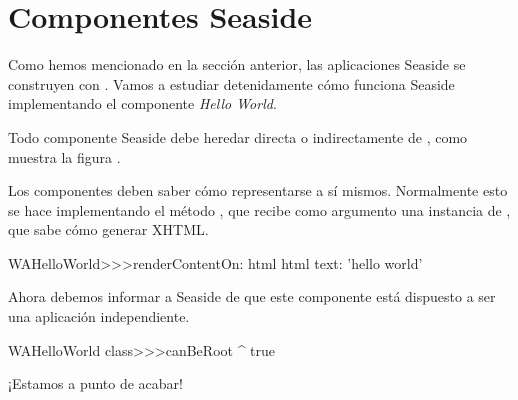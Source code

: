 \documentclass[a4paper,10pt,twoside]{book}
\begin{document}
\section{Componentes Seaside}


Como hemos mencionado en la sección anterior, las aplicaciones Seaside se construyen con \emph{}.
Vamos a estudiar detenidamente cómo funciona Seaside implementando el componente \emph{Hello World}.

Todo componente Seaside debe heredar directa o indirectamente de , como muestra la figura .


Los componentes deben saber cómo representarse a sí mismos.
Normalmente esto se hace implementando el método , que recibe como argumento una instancia de , que sabe cómo generar XHTML.


\begin{code}{}
WAHelloWorld>>>renderContentOn: html
	html text: 'hello world'
\end{code}

\noindent
Ahora debemos informar a Seaside de que este componente está dispuesto a ser una aplicación independiente.


\begin{code}{}
WAHelloWorld class>>>canBeRoot
	^ true
\end{code}

\noindent
¡Estamos a punto de acabar!

\end{document}
